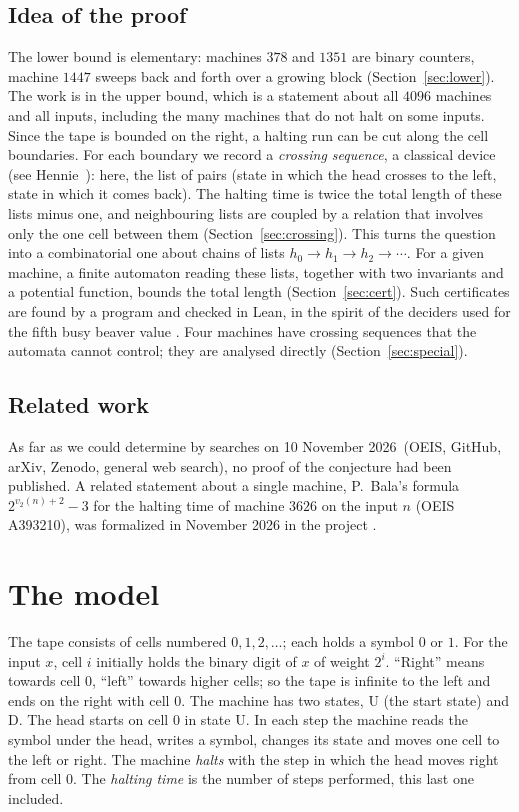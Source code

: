 \documentclass[11pt,a4paper]{amsart}
\theoremstyle{definition}
\theoremstyle{remark}
\newcommand{\U}{\mathrm{U}}
\newcommand{\D}{\mathrm{D}}
\newcommand{\searchdate}{10 November 2026}
\begin{document}
\subsection*{Idea of the proof}
The lower bound is elementary: machines $378$ and $1351$ are binary counters, machine $1447$ sweeps back and
forth over a growing block (Section~\ref{sec:lower}). The work is in the upper bound, which is a statement
about all $4096$ machines and all inputs, including the many machines that do not halt on some inputs.
Since the tape is bounded on the right, a halting run can be cut along the cell boundaries. For each boundary
we record a \emph{crossing sequence}, a classical device (see Hennie~\cite{hennie}): here, the list of pairs (state
in which the head crosses to the left, state in which it comes back). The halting time is twice the total
length of these lists minus one, and neighbouring lists are coupled by a relation that involves only the one
cell between them (Section~\ref{sec:crossing}). This turns the question into a combinatorial one about chains
of lists $h_0\to h_1\to h_2\to\cdots$. For a given machine, a finite automaton reading these lists, together
with two invariants and a potential function, bounds the total length (Section~\ref{sec:cert}). Such
certificates are found by a program and checked in Lean, in the spirit of the deciders used for the fifth
busy beaver value \cite{bb5}. Four machines have crossing sequences that the automata cannot control; they
are analysed directly (Section~\ref{sec:special}).

\subsection*{Related work}
As far as we could determine by searches on \searchdate\ (OEIS, GitHub, arXiv, Zenodo, general web search), no
proof of the conjecture had been published. A related statement about a single machine, P.~Bala's formula
$2^{v_2(n)+2}-3$ for the halting time of machine $3626$ on the input $n$ (OEIS A393210), was formalized in
November 2026 in the project \cite{trureturing}.

\section{The model}\label{sec:model}

The tape consists of cells numbered $0,1,2,\dots$; each holds a symbol $0$ or $1$. For the input $x$, cell $i$
initially holds the binary digit of $x$ of weight $2^i$. ``Right'' means towards cell $0$, ``left'' towards
higher cells; so the tape is infinite to the left and ends on the right with cell $0$. The machine has two
states, $\U$ (the start state) and $\D$. The head starts on cell $0$ in state $\U$. In each step the machine
reads the symbol under the head, writes a symbol, changes its state and moves one cell to the left or right.
The machine \emph{halts} with the step in which the head moves right from cell $0$. The \emph{halting time}
is the number of steps performed, this last one included.
\end{document}
